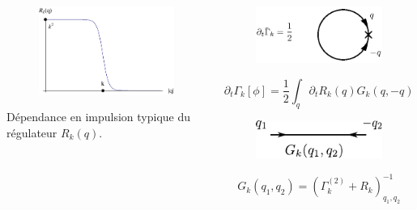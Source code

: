 \documentclass[xcolor=dvipsnames]{beamer}
\newcommand{\p}[1]{\partial_{#1}}
\newcommand{\gam}{\ensuremath{\Gamma}} %
\begin{document}
\begin{frame}

\begin{columns}

\begin{column}{6cm}
\begin{figure}[htp]
\centering
\includegraphics[scale=0.7]{img/regulator2.pdf}
\label{}
\end{figure}
\begin{center}
Dépendance en impulsion typique du régulateur $R_k(q)$.
\end{center}
\end{column}

\begin{column}{6cm}
\begin{figure}[htp]
\centering
\includegraphics[scale=0.825]{img/dtgam.eps}
\label{}
\end{figure}
\[\p{t} \gam_k[\phi] = \frac{1}{2} \int_q \p{t}R_k(q)  G_k(q,-q)  \] 

\begin{figure}[htp]
\centering
\includegraphics[scale=0.825]{img/propagateur.pdf}
\label{}
\end{figure}
\[G_k(q_1,q_2) =  \left( \Gamma^{(2)}_k + R_k \right)^{-1}_{q_1,q_2} \] 
\end{column}

\end{columns}

\end{frame}
\end{document}
